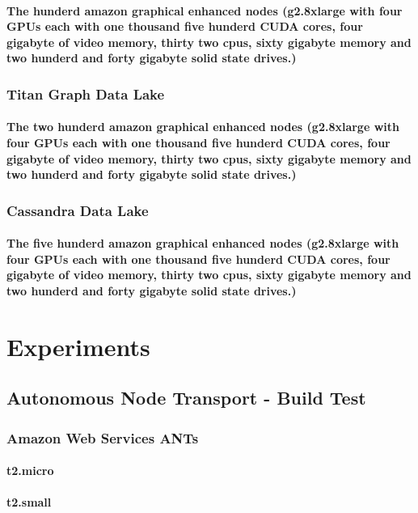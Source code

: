 \documentclass{acm_proc_article-sp}
\begin{document}
\paragraph{The hunderd amazon graphical enhanced nodes (g2.8xlarge with four GPUs each with one thousand five hunderd CUDA cores, four gigabyte of video memory, thirty two cpus, sixty gigabyte memory and two hunderd and forty gigabyte solid state drives.)}
\subsubsection{Titan Graph Data Lake}
\paragraph{The two hunderd amazon graphical enhanced nodes (g2.8xlarge with four GPUs each with one thousand five hunderd CUDA cores, four gigabyte of video memory, thirty two cpus, sixty gigabyte memory and two hunderd and forty gigabyte solid state drives.)}\subsubsection{Cassandra Data Lake}
\paragraph{The five hunderd amazon graphical enhanced nodes (g2.8xlarge with four GPUs each with one thousand five hunderd CUDA cores, four gigabyte of video memory, thirty two cpus, sixty gigabyte memory and two hunderd and forty gigabyte solid state drives.)}
\pagebreak
\section{Experiments}
\subsection{Autonomous Node Transport - Build Test}
\subsubsection{Amazon Web Services ANTs}
\paragraph{t2.micro}
\paragraph{t2.small}
\end{document}
